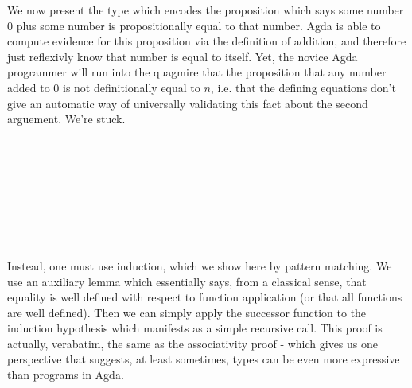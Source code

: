 We now present the type which encodes the proposition which says some number $0$
plus some number is propositionally equal to that number. Agda is able to
compute evidence for this proposition via the definition of addition, and
therefore just reflexivly know that number is equal to itself. Yet, the novice
Agda programmer will run into the quagmire that the proposition that any number
added to $0$ is not definitionally equal to $n$, i.e. that the defining
equations don't give an automatic way of universally validating this fact about
the second arguement. We're stuck.

\begin{code}%
\>[0]\AgdaSpace{}%
\AgdaSymbol{:}\AgdaSpace{}%
\AgdaSpace{}%
\AgdaSymbol{(}\AgdaSpace{}%
\AgdaSymbol{:}\AgdaSpace{}%
\AgdaSymbol{)}\AgdaSpace{}%
\AgdaSpace{}%
\AgdaSpace{}%
\AgdaOperator{\AgdaFunction{+}}\AgdaSpace{}%
\AgdaSpace{}%
\AgdaSpace{}%
\<%
\\
\>[0]\AgdaSpace{}%
\AgdaSpace{}%
\AgdaSymbol{=}\AgdaSpace{}%
\<%
\\
%
\\[\AgdaEmptyExtraSkip]%
\>[0]\AgdaSpace{}%
\AgdaSymbol{:}\AgdaSpace{}%
\AgdaSpace{}%
\AgdaOperator{\AgdaFunction{+}}\AgdaSpace{}%
\AgdaSpace{}%
\AgdaSpace{}%
\<%
\\
\>[0]\AgdaSpace{}%
\AgdaSymbol{=}\AgdaSpace{}%
\<%
\\
%
\\[\AgdaEmptyExtraSkip]%
\>[0]\AgdaSpace{}%
\AgdaSymbol{:}\AgdaSpace{}%
\AgdaSpace{}%
\AgdaSymbol{(}\AgdaSpace{}%
\AgdaSymbol{:}\AgdaSpace{}%
\AgdaSymbol{)}\AgdaSpace{}%
\AgdaSpace{}%
\AgdaSpace{}%
\AgdaOperator{\AgdaFunction{+}}\AgdaSpace{}%
\AgdaSpace{}%
\AgdaSpace{}%
\<%
\\
\>[0]\AgdaSpace{}%
\AgdaSymbol{=}\AgdaSpace{}%
\<%
\end{code}

Instead, one must use induction, which we show here by pattern matching. We use
an auxiliary lemma  which essentially says, from a classical sense,
that equality is well defined with respect to function application (or that all
functions are well defined). Then we can simply apply the successor function to
the induction hypothesis which manifests as a simple recursive call. This proof
is actually, verabatim, the same as the associativity proof - which gives us one
perspective that suggests, at least sometimes, types can be even more expressive
than programs in Agda.

